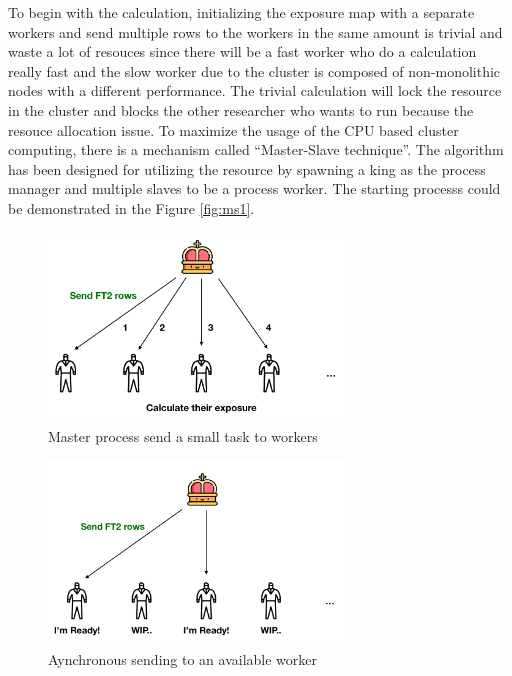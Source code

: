 To begin with the calculation, initializing the exposure map with a 
separate workers and send multiple rows to the workers in the same amount
is trivial and waste a lot of resouces since there will be a fast worker 
who do a calculation really fast and the slow worker due to the cluster 
is composed of non-monolithic nodes with a different performance.
The trivial calculation will lock the resource in the cluster and blocks 
the other researcher who wants to run because the resouce allocation issue.
To maximize the usage of the CPU based cluster computing, there is a 
mechanism called ``Master-Slave technique''. The algorithm has been designed 
for utilizing the resource by spawning a king as the process manager 
and multiple slaves to be a process worker. The starting processs could 
be demonstrated in the Figure \ref{fig:ms1}. 


\begin{figure}[h!]
    \centering
    \includegraphics[width=0.7\textwidth]{content/methodology/figures/ms2}
    \caption{Master process send a small task to workers}
    \label{fig:ms2}
\end{figure}


\begin{figure}[h!]
    \centering
    \includegraphics[width=0.7\textwidth]{content/methodology/figures/ms3}
    \caption{Aynchronous sending to an available worker}
    \label{fig:ms3}
\end{figure}


